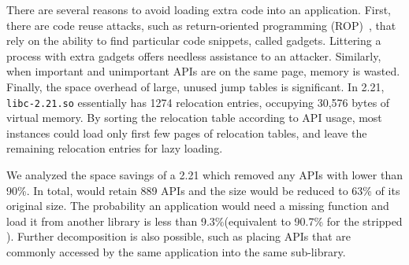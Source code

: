 There are several reasons to avoid loading extra code into an application.
First, there are code reuse attacks, such as return-oriented programming (ROP)~\cite{return-oriented},
that rely on the ability to find particular code snippets, called gadgets.
Littering a process with extra gadgets offers needless assistance to an attacker.
Similarly, when important and unimportant APIs are on the same page,
memory is wasted.  
Finally, the space overhead of large, unused jump tables is significant.
In \glibc{} 2.21, {\tt libc-2.21.so} essentially has 1274 relocation entries, occupying 30,576 bytes of virtual memory. 
By sorting the relocation table according to API usage,
most \libc{} instances could load only first few pages of relocation tables, and leave the remaining relocation entries for lazy loading.

We analyzed the space savings of a 
\glibc{} 2.21 which removed any APIs with \usagemetric{} lower than 90\%.
In total, \libc{} would retain 889 APIs
and the size would be reduced to 63\% of its original size.
The probability an application would need a missing function and load it from another library is less than 9.3\%(equivalent to 90.7\% \compatmetric{} for the stripped \libc{}).
Further decomposition is also possible, 
such as placing APIs
that are commonly accessed by the same application into the same sub-library.




